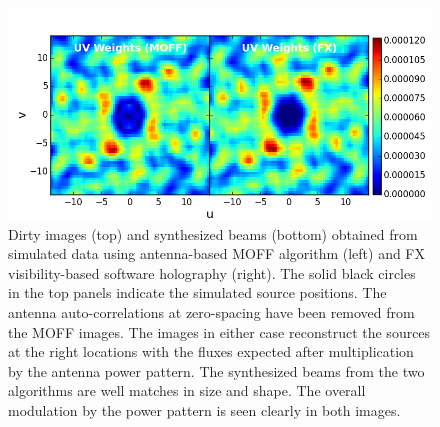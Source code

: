 \documentclass[a4paper,fleqn,usenatbib]{../mnras}
\begin{document}
\begin{figure}
  \includegraphics[width=\columnwidth]{MOFF_FX_comparison_uvwts_test_aperture_zero_spacing_removed.png}
  \caption{Dirty images (top) and synthesized beams (bottom) obtained from 
    simulated data using antenna-based MOFF algorithm (left) and FX 
    visibility-based software holography (right). The solid black circles in the
    top panels indicate the simulated source positions. The antenna 
    auto-correlations at zero-spacing have been removed from the MOFF images. 
    The images in either case reconstruct the sources at the right locations 
    with the fluxes expected after multiplication by the antenna power pattern. 
    The synthesized beams from the two algorithms are well matches in size and
    shape. The overall modulation by the power pattern is seen clearly in both
    images.}
  \label{fig:MOFF-FX-uvwts}
\end{figure}
\end{document}
